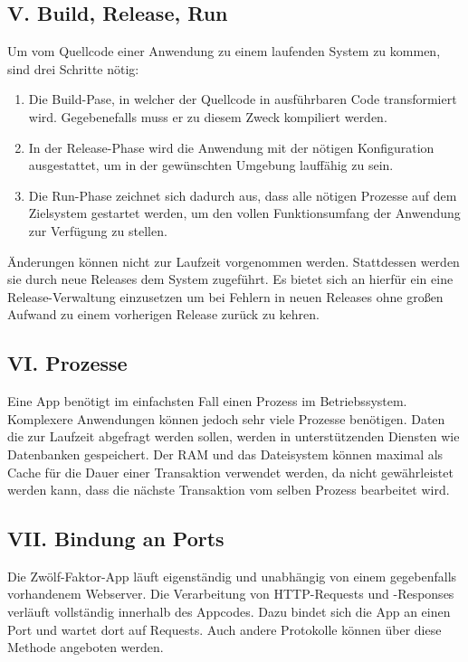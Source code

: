 \documentclass[fleqn,10pt]{SelfArx} %
\begin{document}
\subsection{V. Build, Release, Run}
Um vom Quellcode einer Anwendung zu einem laufenden System zu kommen, sind drei Schritte nötig:
\begin{enumerate}
	\item Die Build-Pase, in welcher der Quellcode in ausführbaren Code transformiert wird. Gegebenefalls muss er zu diesem Zweck kompiliert werden.
	\item In der Release-Phase wird die Anwendung mit der nötigen Konfiguration ausgestattet, um in der gewünschten Umgebung lauffähig zu sein.
	\item Die Run-Phase zeichnet sich dadurch aus, dass alle nötigen Prozesse auf dem Zielsystem gestartet werden, um den vollen Funktionsumfang der Anwendung zur Verfügung zu stellen.
\end{enumerate}
Änderungen können nicht zur Laufzeit vorgenommen werden. Stattdessen werden sie durch neue Releases dem System zugeführt. Es bietet sich an hierfür ein eine Release-Verwaltung einzusetzen um bei Fehlern in neuen Releases ohne großen Aufwand zu einem vorherigen Release zurück zu kehren.
\subsection{VI. Prozesse}
Eine App benötigt im einfachsten Fall einen Prozess im Betriebssystem. Komplexere Anwendungen können jedoch sehr viele Prozesse benötigen. Daten die zur Laufzeit abgefragt werden sollen, werden in unterstützenden Diensten wie Datenbanken gespeichert. Der RAM und das Dateisystem können maximal als Cache für die Dauer einer Transaktion verwendet werden, da nicht gewährleistet werden kann, dass die nächste Transaktion vom selben Prozess bearbeitet wird.


\subsection{VII. Bindung an Ports}
Die Zwölf-Faktor-App läuft eigenständig und unabhängig von einem gegebenfalls vorhandenem Webserver. Die Verarbeitung von HTTP-Requests und -Responses verläuft vollständig innerhalb des Appcodes. Dazu bindet sich die App an einen Port und wartet dort auf Requests. Auch andere Protokolle können über diese Methode angeboten werden.
\end{document}
